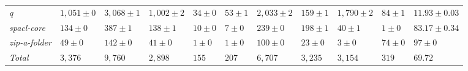 \begin{table}
{\begin{tabular}[t]{lllllllllll}
\textit{q} & $1,051 \pm 0$ & $3,068 \pm 1$ & $1,002 \pm 2$ & $34 \pm 0$ & $53 \pm 1$ & $2,033 \pm 2$ & $159 \pm 1$ & $1,790 \pm 2$ & $84 \pm 1$ & $11.93 \pm 0.03$\\
\textit{spacl-core} & $134 \pm 0$ & $387 \pm 1$ & $138 \pm 1$ & $10 \pm 0$ & $7 \pm 0$ & $239 \pm 0$ & $198 \pm 1$ & $40 \pm 1$ & $1 \pm 0$ & $83.17 \pm 0.34$\\
\textit{zip-a-folder} & $49 \pm 0$ & $142 \pm 0$ & $41 \pm 0$ & $1 \pm 0$ & $1 \pm 0$ & $100 \pm 0$ & $23 \pm 0$ & $3 \pm 0$ & $74 \pm 0$ & $97 \pm 0$\\
\hline\textit{Total} & $3,376$ & $9,760$ & $2,898$ & $155$ & $207$ & $6,707$ & $3,235$ & $3,154$ & $319$ & $69.72$\\
\bottomrule
\end{tabular}}
\end{table}
